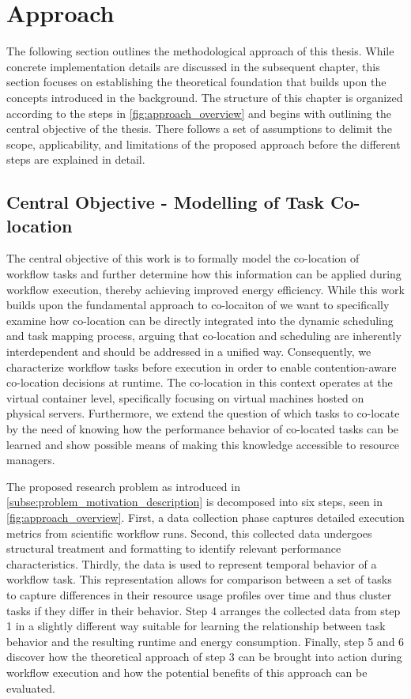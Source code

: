 \section{Approach}
\label{cha:approach}
The following section outlines the methodological approach of this thesis. While concrete implementation details are discussed in the subsequent chapter, this section focuses on establishing the theoretical foundation that builds upon the concepts introduced in the background.
The structure of this chapter is organized according to the steps in \ref{fig:approach_overview} and begins with outlining the central objective of the thesis. There follows a set of assumptions to delimit the scope, applicability, and limitations of the proposed approach before the different steps are explained in detail.

\subsection{Central Objective - Modelling of Task Co-location}
\label{sec:problem_statement}
The central objective of this work is to formally model the co-location of workflow tasks and further determine how this information can be applied during workflow execution, thereby achieving improved energy efficiency.
While this work builds upon the fundamental approach to co-locaiton of \cite{5644899} we want to specifically examine how co-location can be directly integrated into the dynamic scheduling and task mapping process, arguing that co-location and scheduling are inherently interdependent and should be addressed in a unified way. Consequently, we characterize workflow tasks before execution in order to enable contention-aware co-location decisions at runtime. The co-location in this context operates at the virtual container level, specifically focusing on virtual machines hosted on physical servers. Furthermore, we extend the question of which tasks to co-locate by the need of knowing how the performance behavior of co-located tasks can be learned and show possible means of making this knowledge accessible to resource managers.

The proposed research problem as introduced in \ref{subse:problem_motivation_description} is decomposed into six steps, seen in \ref{fig:approach_overview}. First, a data collection phase captures detailed execution metrics from scientific workflow runs. Second, this collected data undergoes structural treatment and formatting to identify relevant performance characteristics. Thirdly, the data is used to represent temporal behavior of a workflow task. This representation allows for comparison between a set of tasks to capture differences in their resource usage profiles over time and thus cluster tasks if they differ in their behavior. Step 4 arranges the collected data from step 1 in a slightly different way suitable for learning the relationship between task behavior and the resulting runtime and energy consumption. Finally, step 5 and 6 discover how the theoretical approach of step 3 can be brought into action during workflow execution and how the potential benefits of this approach can be evaluated.

